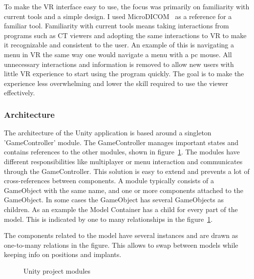 \documentclass[a4paper]{report}
\begin{document}

To make the VR interface easy to use, the focus was primarily on familiarity with current tools and a simple design.
I used MicroDICOM~\cite{noauthor_dicom_nodate-1} as a reference for a familiar tool.
Familiarity with current tools means taking interactions from programs such as CT viewers and adopting the same interactions to VR to make it recognizable and consistent to the user. An example of this is navigating a menu in VR the same way one would navigate a menu with a pc mouse.
 All unnecessary interactions and information is removed to allow new users with little VR experience to start using the program quickly. The goal is to make the experience less overwhelming and lower the skill required to use the viewer effectively.

\subsubsection{Architecture}
The architecture of the Unity application is based around a singleton 'GameController' module. The GameController manages important states and contains references to the other modules, shown in figure~\ref{structure}. The modules have different responsibilities like multiplayer or menu interaction and communicates through the GameController. This solution is easy to extend and prevents a lot of cross-references between components.
A module typically consists of a GameObject with the same name, and one or more components attached to the GameObject. In some cases the GameObject has several GameObjects as children.
As an example the Model Container has a child for every part of the model. This is indicated by one to many relationships in the figure~\ref{structure}.

The components related to the model have several instances and are drawn as one-to-many relations in the figure. This allows to swap between models while keeping info on positions and implants.

\begin{figure}[h!]
    \centering

	\hfill
  \caption{Unity project modules}\label{structure}
  \small

\end{figure}
\end{document}
